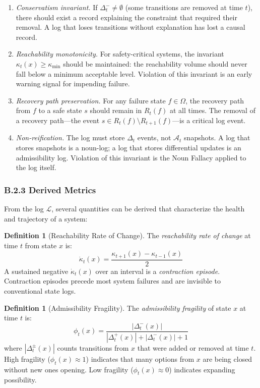 \documentclass[12pt, a4paper]{article}
\theoremstyle{plain}
\theoremstyle{definition}
\newtheorem{definition}[theorem]{Definition}
\theoremstyle{remark}
\begin{document}
\begin{enumerate}[leftmargin=*, label=(\roman*)]
\item \emph{Conservatism invariant.} If $\Delta_t^- \neq \emptyset$ (some
transitions are removed at time $t$), there should exist a record explaining
the constraint that required their removal. A log that loses transitions
without explanation has lost a causal record.

\item \emph{Reachability monotonicity.} For safety-critical systems, the
invariant $\kappa_t(x) \geq \kappa_{\min}$ should be maintained: the
reachability volume should never fall below a minimum acceptable level.
Violation of this invariant is an early warning signal for impending failure.

\item \emph{Recovery path preservation.} For any failure state $f \in \Omega$,
the recovery path from $f$ to a safe state $s$ should remain in $R_t(f)$ at
all times. The removal of a recovery path---the event
$s \in R_t(f) \setminus R_{t+1}(f)$---is a critical log event.

\item \emph{Non-reification.} The log must store $\Delta_t$ events, not
$\mathcal{A}_t$ snapshots. A log that stores snapshots is a noun-log;
a log that stores differential updates is an admissibility log.
Violation of this invariant is the Noun Fallacy applied to the log itself.
\end{enumerate}

\subsubsection*{B.2.3 Derived Metrics}

From the log $\mathcal{L}$, several quantities can be derived that
characterize the health and trajectory of a system:

\begin{definition}[Reachability Rate of Change]
The \emph{reachability rate of change} at time $t$ from state $x$ is:
$$\dot{\kappa}_t(x) = \frac{\kappa_{t+1}(x) - \kappa_{t-1}(x)}{2}$$
A sustained negative $\dot{\kappa}_t(x)$ over an interval is a
\emph{contraction episode}. Contraction episodes precede most system failures
and are invisible to conventional state logs.
\end{definition}

\begin{definition}[Admissibility Fragility]
The \emph{admissibility fragility} of state $x$ at time $t$ is:
$$\phi_t(x) = \frac{|\Delta_t^-(x)|}{|\Delta_t^+(x)| + |\Delta_t^-(x)| + 1}$$
where $|\Delta_t^{\pm}(x)|$ counts transitions from $x$ that were added
or removed at time $t$. High fragility ($\phi_t(x) \approx 1$) indicates
that many options from $x$ are being closed without new ones opening.
Low fragility ($\phi_t(x) \approx 0$) indicates expanding possibility.
\end{definition}
\end{document}
